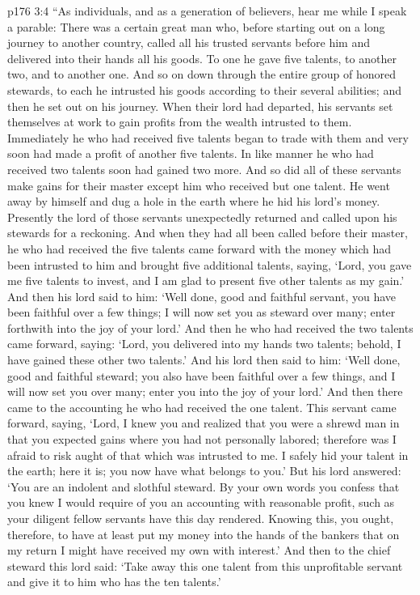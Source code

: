 \vs p176 3:4 “As individuals, and as a generation of believers, hear me while I speak a parable: There was a certain great man who, before starting out on a long journey to another country, called all his trusted servants before him and delivered into their hands all his goods. To one he gave five talents, to another two, and to another one. And so on down through the entire group of honored stewards, to each he intrusted his goods according to their several abilities; and then he set out on his journey. When their lord had departed, his servants set themselves at work to gain profits from the wealth intrusted to them. Immediately he who had received five talents began to trade with them and very soon had made a profit of another five talents. In like manner he who had received two talents soon had gained two more. And so did all of these servants make gains for their master except him who received but one talent. He went away by himself and dug a hole in the earth where he hid his lord’s money. Presently the lord of those servants unexpectedly returned and called upon his stewards for a reckoning. And when they had all been called before their master, he who had received the five talents came forward with the money which had been intrusted to him and brought five additional talents, saying, ‘Lord, you gave me five talents to invest, and I am glad to present five other talents as my gain.’ And then his lord said to him: ‘Well done, good and faithful servant, you have been faithful over a few things; I will now set you as steward over many; enter forthwith into the joy of your lord.’ And then he who had received the two talents came forward, saying: ‘Lord, you delivered into my hands two talents; behold, I have gained these other two talents.’ And his lord then said to him: ‘Well done, good and faithful steward; you also have been faithful over a few things, and I will now set you over many; enter you into the joy of your lord.’ And then there came to the accounting he who had received the one talent. This servant came forward, saying, ‘Lord, I knew you and realized that you were a shrewd man in that you expected gains where you had not personally labored; therefore was I afraid to risk aught of that which was intrusted to me. I safely hid your talent in the earth; here it is; you now have what belongs to you.’ But his lord answered: ‘You are an indolent and slothful steward. By your own words you confess that you knew I would require of you an accounting with reasonable profit, such as your diligent fellow servants have this day rendered. Knowing this, you ought, therefore, to have at least put my money into the hands of the bankers that on my return I might have received my own with interest.’ And then to the chief steward this lord said: ‘Take away this one talent from this unprofitable servant and give it to him who has the ten talents.’
